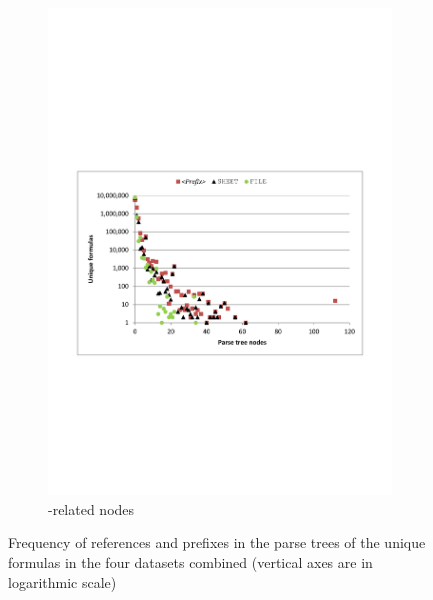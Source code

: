 \documentclass[times]{smrauth}
\begin{document}
\begin{figure}
\begin{subfigure}[b]{0.49\textwidth}
		\includegraphics[width=1\textwidth]{img/nodesPrefix}
		\caption{-related nodes}
		\label{fig:nodesPrefix}
	\end{subfigure}
	
	\caption{Frequency of references and prefixes in the parse trees of the unique formulas in the four datasets combined (vertical axes are in logarithmic scale)}
\end{figure}
\end{document}
